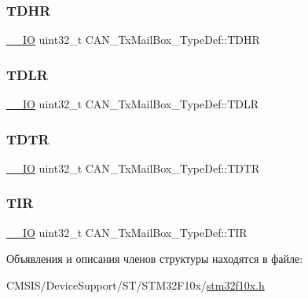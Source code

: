 \subsubsection{\texorpdfstring{TDHR}{TDHR}}
{\footnotesize\ttfamily \mbox{\hyperlink{group___c_m_s_i_s___c_m3__core__definitions_gaec43007d9998a0a0e01faede4133d6be}{\+\_\+\+\_\+\+IO}} uint32\+\_\+t C\+A\+N\+\_\+\+Tx\+Mail\+Box\+\_\+\+Type\+Def\+::\+T\+D\+HR}

\mbox{\label{struct_c_a_n___tx_mail_box___type_def_a408c96501b1cc8bd527432736d132a39}} 
\subsubsection{\texorpdfstring{TDLR}{TDLR}}
{\footnotesize\ttfamily \mbox{\hyperlink{group___c_m_s_i_s___c_m3__core__definitions_gaec43007d9998a0a0e01faede4133d6be}{\+\_\+\+\_\+\+IO}} uint32\+\_\+t C\+A\+N\+\_\+\+Tx\+Mail\+Box\+\_\+\+Type\+Def\+::\+T\+D\+LR}

\mbox{\label{struct_c_a_n___tx_mail_box___type_def_a2351cb865d064cf75f61642aaa887f76}} 
\subsubsection{\texorpdfstring{TDTR}{TDTR}}
{\footnotesize\ttfamily \mbox{\hyperlink{group___c_m_s_i_s___c_m3__core__definitions_gaec43007d9998a0a0e01faede4133d6be}{\+\_\+\+\_\+\+IO}} uint32\+\_\+t C\+A\+N\+\_\+\+Tx\+Mail\+Box\+\_\+\+Type\+Def\+::\+T\+D\+TR}

\mbox{\label{struct_c_a_n___tx_mail_box___type_def_a22f525c909de2dcec1d4093fe1d562b8}} 
\subsubsection{\texorpdfstring{TIR}{TIR}}
{\footnotesize\ttfamily \mbox{\hyperlink{group___c_m_s_i_s___c_m3__core__definitions_gaec43007d9998a0a0e01faede4133d6be}{\+\_\+\+\_\+\+IO}} uint32\+\_\+t C\+A\+N\+\_\+\+Tx\+Mail\+Box\+\_\+\+Type\+Def\+::\+T\+IR}



Объявления и описания членов структуры находятся в файле\+:\begin{DoxyCompactItemize}
\item 
C\+M\+S\+I\+S/\+Device\+Support/\+S\+T/\+S\+T\+M32\+F10x/\mbox{\hyperlink{stm32f10x_8h}{stm32f10x.\+h}}\end{DoxyCompactItemize}
